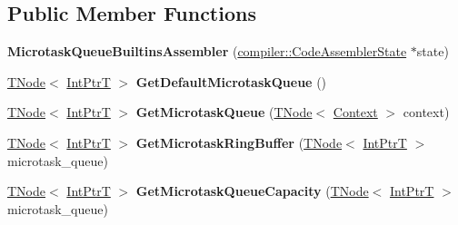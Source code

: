 \subsection*{Public Member Functions}
\begin{DoxyCompactItemize}
\item 
\mbox{\label{classv8_1_1internal_1_1MicrotaskQueueBuiltinsAssembler_a72ab6e4c705a6546da5e5d5e05460536}} 
{\bfseries Microtask\+Queue\+Builtins\+Assembler} (\mbox{\hyperlink{classv8_1_1internal_1_1compiler_1_1CodeAssemblerState}{compiler\+::\+Code\+Assembler\+State}} $\ast$state)
\item 
\mbox{\label{classv8_1_1internal_1_1MicrotaskQueueBuiltinsAssembler_a25221363cb8d6277c8c27582a964db47}} 
\mbox{\hyperlink{classv8_1_1internal_1_1compiler_1_1TNode}{T\+Node}}$<$ \mbox{\hyperlink{structv8_1_1internal_1_1IntPtrT}{Int\+PtrT}} $>$ {\bfseries Get\+Default\+Microtask\+Queue} ()
\item 
\mbox{\label{classv8_1_1internal_1_1MicrotaskQueueBuiltinsAssembler_a2b44bbdcea1b032c92884d622a13f308}} 
\mbox{\hyperlink{classv8_1_1internal_1_1compiler_1_1TNode}{T\+Node}}$<$ \mbox{\hyperlink{structv8_1_1internal_1_1IntPtrT}{Int\+PtrT}} $>$ {\bfseries Get\+Microtask\+Queue} (\mbox{\hyperlink{classv8_1_1internal_1_1compiler_1_1TNode}{T\+Node}}$<$ \mbox{\hyperlink{classv8_1_1internal_1_1Context}{Context}} $>$ context)
\item 
\mbox{\label{classv8_1_1internal_1_1MicrotaskQueueBuiltinsAssembler_afb3c5a3a1d7b51651b80d2d220035000}} 
\mbox{\hyperlink{classv8_1_1internal_1_1compiler_1_1TNode}{T\+Node}}$<$ \mbox{\hyperlink{structv8_1_1internal_1_1IntPtrT}{Int\+PtrT}} $>$ {\bfseries Get\+Microtask\+Ring\+Buffer} (\mbox{\hyperlink{classv8_1_1internal_1_1compiler_1_1TNode}{T\+Node}}$<$ \mbox{\hyperlink{structv8_1_1internal_1_1IntPtrT}{Int\+PtrT}} $>$ microtask\+\_\+queue)
\item 
\mbox{\label{classv8_1_1internal_1_1MicrotaskQueueBuiltinsAssembler_ab9869705f4d6308fbf455a83744563b6}} 
\mbox{\hyperlink{classv8_1_1internal_1_1compiler_1_1TNode}{T\+Node}}$<$ \mbox{\hyperlink{structv8_1_1internal_1_1IntPtrT}{Int\+PtrT}} $>$ {\bfseries Get\+Microtask\+Queue\+Capacity} (\mbox{\hyperlink{classv8_1_1internal_1_1compiler_1_1TNode}{T\+Node}}$<$ \mbox{\hyperlink{structv8_1_1internal_1_1IntPtrT}{Int\+PtrT}} $>$ microtask\+\_\+queue)

\end{DoxyCompactItemize}

